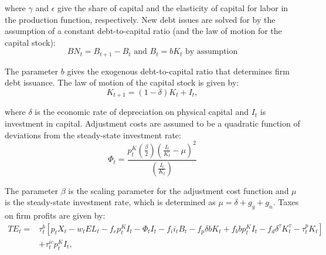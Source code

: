 \noindent\noindent where $\gamma$ and $\epsilon$ give the share of capital and the elasticity of capital for labor in the production function, respectively.  New debt issues are solved for by the assumption of a constant debt-to-capital ratio (and the law of motion for the capital stock):
\begin{equation}
\label{eqn:debt}
BN_{t}=B_{t+1} - B_{t} \text{ and } B_{t}=bK_{t} \text{ by assumption} 
\end{equation}

\noindent\noindent  The parameter $b$ gives the exogenous debt-to-capital ratio that determines firm debt issuance. The law of motion of the capital stock is given by:
\begin{equation}
\label{eqn:lom_capital}
K_{t+1}=(1-\delta)K_{t} + I_{t},
\end{equation}

\noindent\noindent where $\delta$ is the economic rate of depreciation on physical capital and $I_{t}$ is investment in capital.  Adjustment costs are assumed to be a quadratic function of deviations from the steady-state investment rate:
\begin{equation}
\label{eqn:adj_cost}
\Phi_{t}=\frac{p^{K}_{t}\left(\frac{\beta}{2}\right)\left(\frac{I_{t}}{K_{t}}-\mu\right)^{2}}{\left(\frac{I_{t}}{K_{t}}\right)}
\end{equation}

\noindent\noindent The parameter $\beta$ is the scaling parameter for the adjustment cost function and $\mu$ is the steady-state investment rate, which is determined as $\mu=\delta+g_{y}+g_{n}$.  Taxes on firm profits are given by:
\begin{equation}
\label{eqn:corp_tax}
\begin{split}
TE_{t}= & \tau^{b}_{t}\left[p_{t}X_{t}-w_{t}EL_{t}-f_{e}p^{K}_{t}I_{t}-\Phi_{t}I_{t}-f_{i}i_{t}B_{t}-f_{p}\delta b K_{t}+f_{b}bp^{K}_{t}I_{t}-f_{d}\delta^{\tau}K^{\tau}_{t}-\tau^{p}_{t}K_{t}\right] \\
& +\tau^{ic}_{t}p^{K}_{t}I_{t},
\end{split}
\end{equation}

